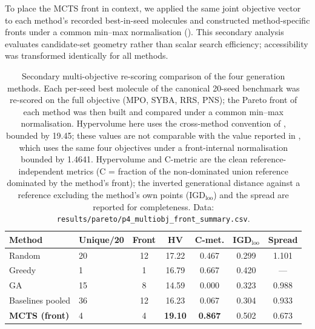 \documentclass[10pt,a4paper]{article}
\begin{document}
To place the MCTS front in context, we applied the same joint objective vector to each method's recorded best-in-seed molecules and constructed method-specific fronts under a common min--max normalisation (). This secondary analysis evaluates candidate-set geometry rather than scalar search efficiency; accessibility was transformed identically for all methods.

\begin{table}[htbp]
  \centering
  \caption{Secondary multi-objective re-scoring comparison of the four generation methods. Each per-seed best molecule of the canonical \num{20}-seed benchmark was re-scored on the full objective (MPO, SYBA, RRS, PNS); the Pareto front of each method was then built and compared under a common min--max normalisation. Hypervolume here uses the cross-method convention of , bounded by \num{19.45}; these values are not comparable with the value reported in , which uses the same four objectives under a front-internal normalisation bounded by \num{1.4641}. Hypervolume and C-metric are the clean reference-independent metrics (C = fraction of the non-dominated union reference dominated by the method's front); the inverted generational distance against a reference excluding the method's own points (IGD${}_{\mathrm{loo}}$) and the spread are reported for completeness. Data: \texttt{results/pareto/p4\_multiobj\_front\_summary.csv}.}
  \label{tab:front_comp}
  \begin{tabular}{llccccc}
    \toprule
    Method & Unique/20 & Front & HV & C-met. & IGD${}_{\mathrm{loo}}$ & Spread \\
    \midrule
    Random   & \num{20} & \num{12}  & \num{17.22} & \num{0.467} & \num{0.299} & \num{1.101} \\
    Greedy   & \num{1}  & \num{1}  & \num{16.79} & \num{0.667} & \num{0.420} & --- \\
    GA       & \num{15} & \num{8}  & \num{14.59} & \num{0.000} & \num{0.323} & \num{0.988} \\
    Baselines pooled & \num{36} & \num{12} & \num{16.23} & \num{0.067} & \num{0.304} & \num{0.933} \\
    \textbf{MCTS (front)} & \num{4} & \num{4} & \textbf{\num{19.10}} & \textbf{\num{0.867}} & \num{0.502} & \num{0.673} \\
    \bottomrule
  \end{tabular}
\end{table}
\end{document}
